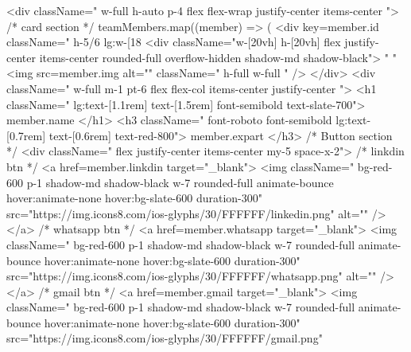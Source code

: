 {         <div className=" w-full h-auto  p-4 flex flex-wrap justify-center items-center   ">
            {/* card section  */}
            {teamMembers.map((member) => (
               <div
                  key={member.id}
                  className=" h-5/6 lg:w-[18%
                  <div className="w-[20vh] h-[20vh] flex justify-center items-center  rounded-full overflow-hidden shadow-md shadow-black">
                     {" "}
                     <img src={member.img} alt="" className=" h-full w-full " />
                  </div>
                  <div className=" w-full m-1  pt-6 flex flex-col items-center justify-center ">
                     <h1 className=" lg:text-[1.1rem] text-[1.5rem]  font-semibold text-slate-700">
                        {member.name}
                     </h1>
                     <h3 className=" font-roboto font-semibold lg:text-[0.7rem] text-[0.6rem] text-red-800">
                        {member.expart}
                     </h3>
                     {/* Button section */}
                     <div className=" flex justify-center items-center my-5 space-x-2">
                        {/* linkdin btn */}
                        <a href={member.linkdin} target="_blank">
                           <img
                              className=" bg-red-600 p-1 shadow-md shadow-black w-7 rounded-full animate-bounce hover:animate-none hover:bg-slate-600 duration-300"
                              src="https://img.icons8.com/ios-glyphs/30/FFFFFF/linkedin.png"
                              alt=""
                           />
                        </a>
                        {/* whatsapp btn */}
                        <a href={member.whatsapp} target="_blank">
                           <img
                              className=" bg-red-600 p-1  shadow-md shadow-black  w-7 rounded-full animate-bounce hover:animate-none hover:bg-slate-600 duration-300"
                              src="https://img.icons8.com/ios-glyphs/30/FFFFFF/whatsapp.png"
                              alt=""
                           />
                        </a>
                        {/* gmail btn */}
                        <a href={member.gmail} target="_blank">
                           <img
                              className=" bg-red-600 p-1 shadow-md shadow-black  w-7 rounded-full animate-bounce hover:animate-none hover:bg-slate-600 duration-300"
                              src="https://img.icons8.com/ios-glyphs/30/FFFFFF/gmail.png"
}}
